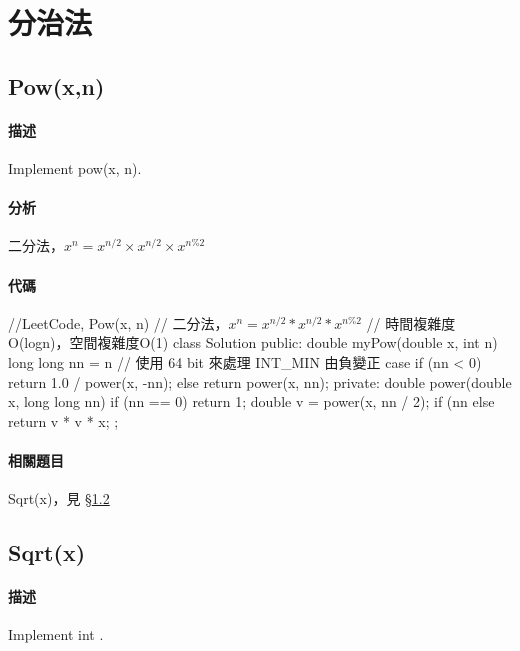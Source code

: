 \chapter{分治法}


\section{Pow(x,n)} %
\label{sec:pow}


\subsubsection{描述}
Implement pow(x, n).


\subsubsection{分析}
二分法，$x^n = x^{n/2} \times x^{n/2} \times x^{n\%2}$


\subsubsection{代碼}
\begin{Code}
//LeetCode, Pow(x, n)
// 二分法，$x^n = x^{n/2} * x^{n/2} * x^{n\%2}$
// 時間複雜度O(logn)，空間複雜度O(1)
class Solution {
public:
    double myPow(double x, int n) {
        long long nn = n // 使用 64 bit 來處理 INT_MIN 由負變正 case
        if (nn < 0) return 1.0 / power(x, -nn);
        else return power(x, nn);
    }
private:
    double power(double x, long long nn) {
        if (nn == 0) return 1;
        double v = power(x, nn / 2);
        if (nn %
        else return v * v * x;
    }
};
\end{Code}


\subsubsection{相關題目}

\begindot
\item Sqrt(x)，見 \S \ref{sec:sqrt}
\myenddot


\section{Sqrt(x)} %
\label{sec:sqrt}

\subsubsection{描述}
Implement int .

